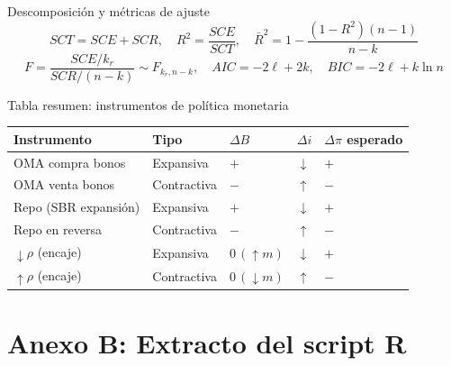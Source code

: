 \documentclass[12pt,a4paper]{article}
\begin{document}
\begin{defbox}{Descomposición y métricas de ajuste}
\[SCT=SCE+SCR,\quad R^2=\frac{SCE}{SCT},\quad
\bar R^2=1-\frac{(1-R^2)(n-1)}{n-k}\]
\[F=\frac{SCE/k_r}{SCR/(n-k)}\sim F_{k_r,n-k},\quad
AIC=-2\ell+2k,\quad BIC=-2\ell+k\ln n\]
\end{defbox}

\begin{defbox}{Tabla resumen: instrumentos de política monetaria}
\begin{center}\small
\begin{tabular}{lllll}
\toprule
\textbf{Instrumento} & \textbf{Tipo} & $\Delta B$ & $\Delta i$ & $\Delta\pi$ esperado\\
\midrule
OMA compra bonos & Expansiva & $+$ & $\downarrow$ & $+$\\
OMA venta bonos  & Contractiva & $-$ & $\uparrow$ & $-$\\
Repo (SBR expansión) & Expansiva & $+$ & $\downarrow$ & $+$\\
Repo en reversa  & Contractiva & $-$ & $\uparrow$ & $-$\\
$\downarrow\rho$ (encaje) & Expansiva & $0\,(\uparrow m)$ & $\downarrow$ & $+$\\
$\uparrow\rho$ (encaje) & Contractiva & $0\,(\downarrow m)$ & $\uparrow$ & $-$\\
\bottomrule
\end{tabular}
\end{center}
\end{defbox}

\section{Anexo B: Extracto del script R}
\end{document}
